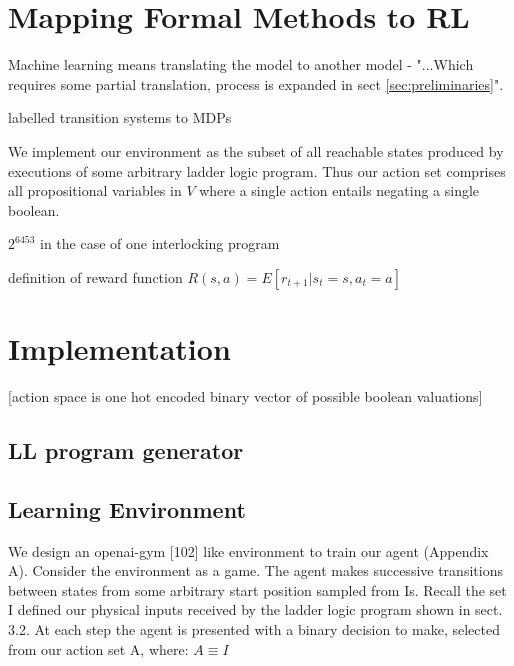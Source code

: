 \documentclass[runningheads]{llncs}
\begin{document}
\section{Mapping Formal Methods to RL}

Machine learning means translating the model to another model - "...Which requires some partial translation, process is expanded in sect \ref{sec:preliminaries}".

labelled transition systems to MDPs


We implement our environment as the subset of all reachable states produced by executions of some arbitrary ladder logic program.  Thus our action set comprises all propositional variables in $V$ where a single action entails negating a single boolean.

$2^{6453}$ in the case of one interlocking program

definition of reward function $R(s,a) = E\left[r_{t+1} | s_t = s, a_t = a\right]$
\section{Implementation}
[action space is one hot encoded binary vector of possible boolean valuations]


\subsection{LL program generator}
\subsection{Learning Environment}
 We design an openai-gym [102] like environment to train our agent (Appendix A).
Consider the environment as a game. The agent makes successive transitions between states from some arbitrary start position sampled from Is. Recall the set I  defined our physical inputs received by the ladder logic program shown in sect. 3.2. At each step the agent is presented with a binary decision to make, selected from our action set A, where: $A \equiv I$
\end{document}
